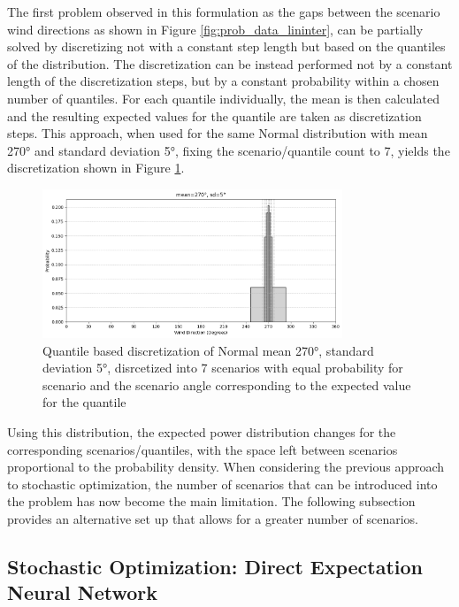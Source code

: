 The first problem observed in this formulation as the gaps between the scenario wind directions as shown in Figure \ref{fig:prob_data_lininter}, can be partially solved by discretizing not with a constant step length but based on the quantiles of the distribution. The discretization can be instead performed not by a constant length of the discretization steps, but by a constant probability within a chosen number of quantiles. For each quantile individually, the mean is then calculated and the resulting expected values for the quantile are taken as discretization steps. This approach, when used for the same Normal distribution with mean 270° and standard deviation 5°, fixing the scenario/quantile count to 7, yields the discretization shown in Figure \ref{fig:wind_dist_opti_quantiles}. 

\begin{figure}[h] 
	\centering
	\includegraphics[width=0.8\textwidth]{figures/optimization/wind_dist_opti_quantiles.png} 
	\caption{Quantile based discretization of Normal mean 270°,  standard deviation 5°, disrcetized into 7 scenarios with equal probability for scenario and the scenario angle corresponding to the expected value for the quantile }
	\label{fig:wind_dist_opti_quantiles}
\end{figure} 

Using this distribution, the expected power distribution changes for the corresponding scenarios/quantiles, with the space left between scenarios proportional to the probability density. When considering the previous approach to stochastic optimization, the number of scenarios that can be introduced into the problem has now become the main limitation. The following subsection provides an alternative set up that allows for a greater number of scenarios.

\subsection{Stochastic Optimization: Direct Expectation Neural Network}

